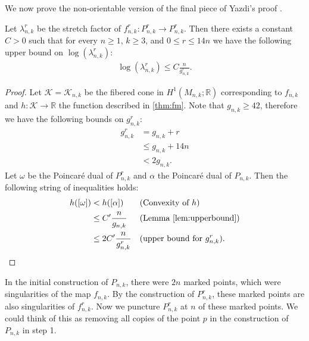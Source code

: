 We now prove the non-orientable version of the final piece of Yazdi's proof \cite[Lemma 3.6]{yazdi2018pseudo}.
\begin{lem}
\label{lem:bound}
Let $\lambda_{n,k}^r$ be the stretch factor of $f_{n,k}^r:P_{n,k}^r\rightarrow P_{n,k}^r$. Then there exists a constant $C > 0$ such that for every $n \geq 1$, $k \geq 3$, and $0 \leq r \leq 14n$ we have the following upper bound on $\log(\lambda_{n,k}^r)$:
\begin{align*}
  \log(\lambda^r_{n,k}) \leq C\frac{n}{g^r_{n,k}}.
\end{align*}
\end{lem}
\begin{proof}
  Let $\mathcal{K} = \mathcal{K}_{n,k}$ be the fibered cone in $H^1(M_{n,k};\mathbb{R})$ corresponding to $f_{n,k}$ and $h: \mathcal{K} \xrightarrow[]{} \mathbb{R}$
  the function described in \autoref{thm:fm}. Note that $g_{n,k}\geq 42$, therefore we have the following bounds on $g_{n,k}^r$:
  \begin{align*}
    g^r_{n,k} &= g_{n,k} + r \\
              &\leq g_{n,k} + 14n \\
              &< 2g_{n,k}.
  \end{align*}
  Let $\omega$ be the Poincar\'e dual of $P^r_{n,k}$ and $\alpha$ the Poincar\'e dual of $P_{n,k}$.  Then the following string of inequalities holds:
  \begin{align*}
    h([\omega]) &< h([\alpha]) &&\text{(Convexity of $h$)}\\
                &\leq C'\frac{n}{g_{n,k}} &&\text{(Lemma \ref{lem:upperbound})}\\
                &\leq 2C'\frac{n}{g^r_{n,k}}&&\text{(upper bound for $g_{n,k}^r$)}.
  \end{align*}
\end{proof}


In the initial construction of $P_{n,k}$, there were $2n$  marked points, which were singularities of the map $f_{n,k}$.  By the construction of $P_{n,k}^r$, these marked points are also singularities of $f^r_{n,k}$.  Now we puncture $P_{n,k}^r$ at $n$ of these marked points.  We could think of this as removing all copies of the point $p$ in the construction of $P_{n,k}$ in step 1. %

